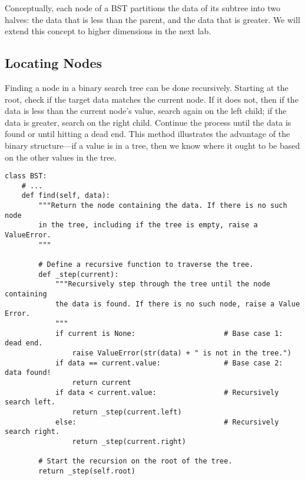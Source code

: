 \begin{info}
Conceptually, each node of a BST partitions the data of its subtree into two halves: the data that is less than the parent, and the data that is greater.
We will extend this concept to higher dimensions in the next lab.
\end{info}

\subsection*{Locating Nodes} %

Finding a node in a binary search tree can be done recursively.
Starting at the root, check if the target data matches the current node.
If it does not, then if the data is less than the current node's value, search again on the left child; if the data is greater, search on the right child.
Continue the process until the data is found or until hitting a dead end.
This method illustrates the advantage of the binary structure---if a value is in a tree, then we know where it ought to be based on the other values in the tree.

\begin{lstlisting}
class BST:
    # ...
    def find(self, data):
        """Return the node containing the data. If there is no such node
        in the tree, including if the tree is empty, raise a ValueError.
        """

        # Define a recursive function to traverse the tree.
        def _step(current):
            """Recursively step through the tree until the node containing
            the data is found. If there is no such node, raise a Value Error.
            """
            if current is None:                     # Base case 1: dead end.
                raise ValueError(str(data) + " is not in the tree.")
            if data == current.value:               # Base case 2: data found!
                return current
            if data < current.value:                # Recursively search left.
                return _step(current.left)
            else:                                   # Recursively search right.
                return _step(current.right)

        # Start the recursion on the root of the tree.
        return _step(self.root)
\end{lstlisting}

